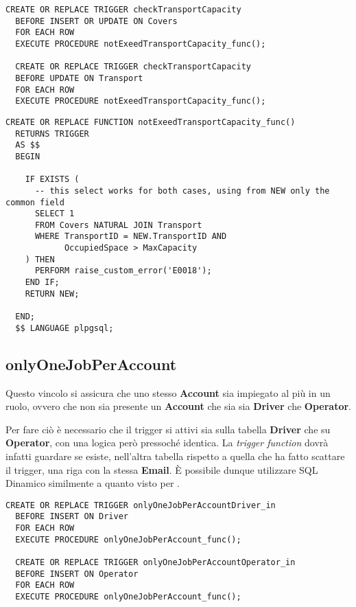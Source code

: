 \begin{lstlisting}[caption={Trigger per il vincolo \textbf{checkTransportCapacity}}]
  CREATE OR REPLACE TRIGGER checkTransportCapacity
  BEFORE INSERT OR UPDATE ON Covers
  FOR EACH ROW
  EXECUTE PROCEDURE notExeedTransportCapacity_func();

  CREATE OR REPLACE TRIGGER checkTransportCapacity
  BEFORE UPDATE ON Transport
  FOR EACH ROW
  EXECUTE PROCEDURE notExeedTransportCapacity_func();
\end{lstlisting}

\begin{lstlisting}[caption={Funzione per il vincolo \textbf{checkTransportCapacity}}]
  CREATE OR REPLACE FUNCTION notExeedTransportCapacity_func()
  RETURNS TRIGGER
  AS $$
  BEGIN
     
    IF EXISTS (
      -- this select works for both cases, using from NEW only the common field
      SELECT 1
      FROM Covers NATURAL JOIN Transport
      WHERE TransportID = NEW.TransportID AND
            OccupiedSpace > MaxCapacity
    ) THEN
      PERFORM raise_custom_error('E0018');
    END IF;
    RETURN NEW;

  END;
  $$ LANGUAGE plpgsql;
\end{lstlisting}

\newpage

\subsection{\textbf{onlyOneJobPerAccount}}

Questo vincolo si assicura che uno stesso \textbf{Account} sia impiegato al più in un ruolo, ovvero che non sia presente un \textbf{Account} che sia sia \textbf{Driver} che \textbf{Operator}.

Per fare ciò è necessario che il trigger si attivi sia sulla tabella \textbf{Driver} che su \textbf{Operator}, con una logica però pressoché identica. La \textit{trigger function} dovrà infatti guardare se esiste, nell'altra tabella rispetto a quella che ha fatto scattare il trigger, una riga con la stessa \textbf{Email}.
È possibile dunque utilizzare SQL Dinamico similmente a quanto visto per .

\begin{lstlisting}[caption={Trigger per il vincolo \textbf{onlyOneJobPerAccount}}]
  CREATE OR REPLACE TRIGGER onlyOneJobPerAccountDriver_in
  BEFORE INSERT ON Driver
  FOR EACH ROW
  EXECUTE PROCEDURE onlyOneJobPerAccount_func();

  CREATE OR REPLACE TRIGGER onlyOneJobPerAccountOperator_in
  BEFORE INSERT ON Operator
  FOR EACH ROW
  EXECUTE PROCEDURE onlyOneJobPerAccount_func();
\end{lstlisting}

